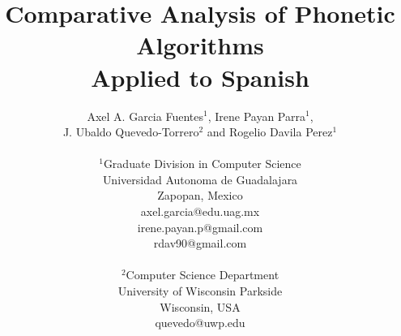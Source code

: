 \documentclass[9pt,conference]{IEEEtran}
\begin{document}
%
\title{Comparative Analysis of Phonetic Algorithms \\Applied to Spanish}


\author{
    \IEEEauthorblockN
    {
        Axel A. Garcia Fuentes$^{1}$,
        Irene Payan Parra$^{1}$,\\
        J. Ubaldo Quevedo-Torrero$^{2}$
        and Rogelio Davila Perez$^{1}$\\
        \\
    }
    \IEEEauthorblockA
    {
        $^{1}$Graduate Division in Computer Science\\
        Universidad Autonoma de Guadalajara\\
        Zapopan, Mexico\\
        axel.garcia@edu.uag.mx\\
        irene.payan.p@gmail.com\\ 
        rdav90@gmail.com\\
        \\
    }
    \IEEEauthorblockA
    {
        $^{2}$Computer Science Department\\
        University of Wisconsin Parkside\\
        Wisconsin, USA\\
        quevedo@uwp.edu
    }
}


% 
\end{document}
